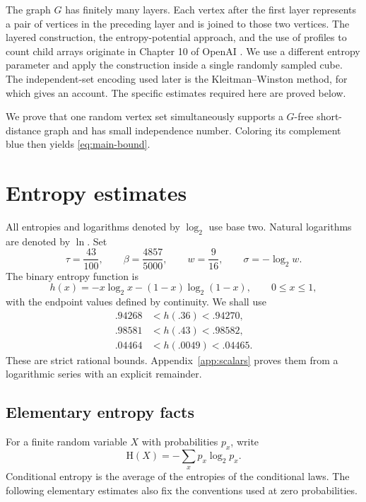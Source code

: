 \documentclass[11pt,leqno]{amsart}
\numberwithin{equation}{section}
\theoremstyle{definition}
\theoremstyle{remark}
\newcommand{\HH}{\mathrm H}
\begin{document}
The graph $G$ has finitely many layers. Each vertex after the first layer represents a pair of vertices in the preceding layer and is joined to those two vertices. The layered construction, the entropy-potential approach, and the use of profiles to count child arrays originate in Chapter 10 of OpenAI \cite{OpenAI}. We use a different entropy parameter and apply the construction inside a single randomly sampled cube. The independent-set encoding used later is the Kleitman--Winston method, for which \cite[Section 3]{BTW} gives an account. The specific estimates required here are proved below.

We prove that one random vertex set simultaneously supports a $G$-free short-distance graph and has small independence number. Coloring its complement blue then yields \eqref{eq:main-bound}.

\section{Entropy estimates}

All entropies and logarithms denoted by $\log_2$ use base two. Natural logarithms are denoted by $\ln$. Set
\begin{equation}\label{eq:constants}
 \tau=\frac{43}{100},\qquad
 \beta=\frac{4857}{5000},\qquad
 w=\frac9{16},\qquad
 \sigma=-\log_2 w.
\end{equation}
The binary entropy function is
\[
 h(x)=-x\log_2 x-(1-x)\log_2(1-x),\qquad 0\le x\le1,
\]
with the endpoint values defined by continuity. We shall use
\begin{equation}\label{eq:scalar-bounds}
\begin{aligned}
 .94268&<h(.36)<.94270,\\
 .98581&<h(.43)<.98582,\\
 .04464&<h(.0049)<.04465.
\end{aligned}
\end{equation}
These are strict rational bounds. Appendix~\ref{app:scalars} proves them from a logarithmic series with an explicit remainder.

\subsection{Elementary entropy facts}

For a finite random variable $X$ with probabilities $p_x$, write
\[
 \HH(X)=-\sum_x p_x\log_2 p_x.
\]
Conditional entropy is the average of the entropies of the conditional laws. The following elementary estimates also fix the conventions used at zero probabilities.
\end{document}
